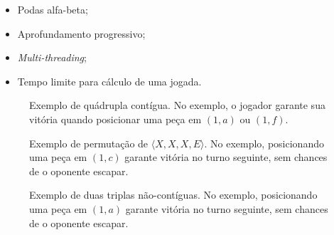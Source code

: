 \documentclass{article}
\begin{document}
    \begin{itemize}
        \item Podas alfa-beta;
        \item Aprofundamento progressivo;
        \item \textit{Multi-threading};
        \item Tempo limite para cálculo de uma jogada.
    \end{itemize}

    \begin{figure}[h]
        \centering
        \caption{Exemplo de quádrupla contígua. No exemplo, o
        jogador garante sua vitória quando posicionar uma peça
        em $(1, a)$ ou $(1, f)$.\label{win-four}}
        \begin{othelloboard}{1}
            \dotmarkings{}
        \end{othelloboard}
    \end{figure}

    \begin{figure}
        \centering
        \caption{Exemplo de permutação de $\langle X, X, X, E
        \rangle$. No exemplo, posicionando uma peça em $(1, c)$
        garante vitória no turno seguinte, sem chances de o
        oponente escapar.\label{win-four-permut}}
        \begin{othelloboard}{1}
            \dotmarkings{}
        \end{othelloboard}
    \end{figure}

    \begin{figure}
        \centering
        \caption{Exemplo de duas triplas não-contíguas. No
        exemplo, posicionando uma peça em $(1, a)$ garante
        vitória no turno seguinte, sem chances de o oponente
        escapar.\label{win-shared-triple}}
        \begin{othelloboard}{1}
            \dotmarkings{}
        \end{othelloboard}
    \end{figure}
\end{document}
